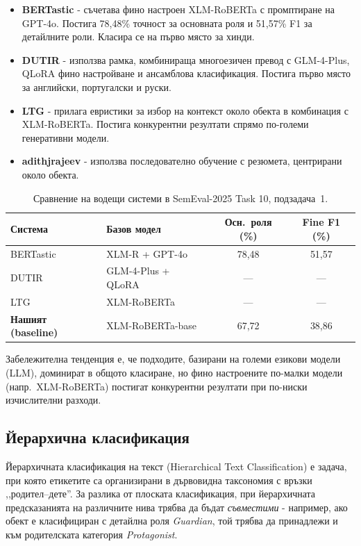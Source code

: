 \documentclass[12pt,a4paper]{report}
\begin{document}
\begin{itemize}
  \item \textbf{BERTastic} \cite{mahmoud2025bertastic} - съчетава фино настроен XLM-RoBERTa с промптиране на GPT-4o. Постига 78,48\% точност за основната роля и 51,57\% F1 за детайлните роли. Класира се на първо място за хинди.
  \item \textbf{DUTIR} \cite{lv2025dutir} - използва рамка, комбинираща многоезичен превод с GLM-4-Plus, QLoRA фино настройване и ансамблова класификация. Постига първо място за английски, португалски и руски.
  \item \textbf{LTG} \cite{ronningstad2025ltg} - прилага евристики за избор на контекст около обекта в комбинация с XLM-RoBERTa. Постига конкурентни резултати спрямо по-големи генеративни модели.
  \item \textbf{adithjrajeev} \cite{rajeev2025adithjrajeev} - използва последователно обучение с резюмета, центрирани около обекта.
\end{itemize}

\begin{table}[H]
\centering
\caption{Сравнение на водещи системи в SemEval-2025 Task 10, подзадача~1.}
\label{tab:semeval_systems}
\begin{tabular}{llcc}
\toprule
\textbf{Система} & \textbf{Базов модел} & \textbf{Осн.\ роля (\%)} & \textbf{Fine F1 (\%)} \\
\midrule
BERTastic & XLM-R + GPT-4o & 78,48 & 51,57 \\
DUTIR & GLM-4-Plus + QLoRA & --- & --- \\
LTG & XLM-RoBERTa & --- & --- \\
\midrule
\textbf{Нашият (baseline)} & XLM-RoBERTa-base & 67,72 & 38,86 \\
\bottomrule
\end{tabular}
\end{table}

Забележителна тенденция е, че подходите, базирани на големи езикови модели (LLM), доминират в общото класиране, но фино настроените по-малки модели (напр.\ XLM-RoBERTa) постигат конкурентни резултати при по-ниски изчислителни разходи.

\subsection{Йерархична класификация}
\label{sec:hierarchical}

Йерархичната класификация на текст (Hierarchical Text Classification) е задача, при която етикетите са организирани в дървовидна таксономия с връзки ,,родител--дете''. За разлика от плоската класификация, при йерархичната предсказанията на различните нива трябва да бъдат \textit{съвместими} - например, ако обект е класифициран с детайлна роля \textit{Guardian}, той трябва да принадлежи и към родителската категория \textit{Protagonist}.
\end{document}
